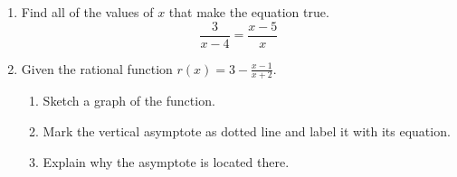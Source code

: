 \documentclass[12pt, twoside]{article}
\begin{document}
\begin{enumerate}[itemsep=0.5cm]
\item Find all of the values of $x$ that make the equation true. 
$$\frac{3}{x-4} = \frac{x-5}{x}$$ \vspace{4cm}

\newpage
      
\item Given the rational function $\displaystyle r(x)= 3 -\frac{x - 1}{x + 2}$. %
        \begin{enumerate}[itemsep=0.25cm]
            \item Sketch a graph of the function.
            \item Mark the vertical asymptote as dotted line and label it with its equation.
            \item Explain why the asymptote is located there.
        \end{enumerate}
        \begin{center}
        \end{center}



\end{enumerate}
\end{document}
